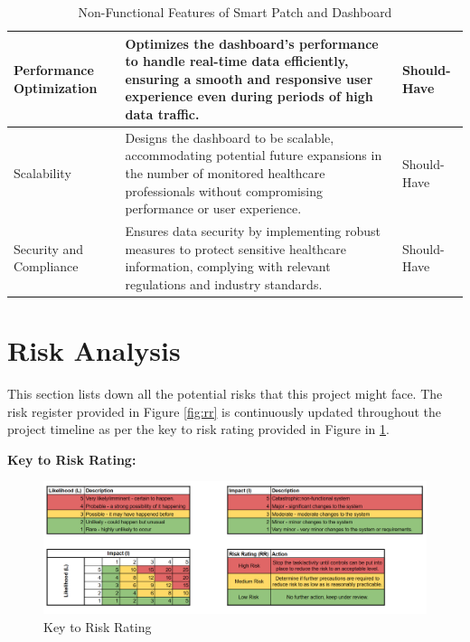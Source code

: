 \begin{table}[h!]
\begin{tabularx}{\textwidth}{|p{3cm}|X|p{2cm}|}
        Performance Optimization
        & Optimizes the dashboard's performance to handle real-time data efficiently, ensuring a smooth and responsive user experience even during periods of high data traffic.
        & Should-Have \\ \hline

        Scalability
        & Designs the dashboard to be scalable, accommodating potential future expansions in the number of monitored healthcare professionals without compromising performance or user experience.
        & Should-Have \\ \hline

        Security and Compliance
        & Ensures data security by implementing robust measures to protect sensitive healthcare information, complying with relevant regulations and industry standards.
        & Should-Have \\ \hline

    \end{tabularx}
    \caption{Non-Functional Features of Smart Patch and Dashboard}
    \label{table:non-functional-sp-db}
\end{table}

\newpage
\section{Risk Analysis}
 This section lists down all the potential risks that this project might face. The risk register provided in Figure \ref{fig:rr} is continuously updated throughout the project timeline as per the key to risk rating provided in Figure in \ref{fig:ktrr}.

\vspace{5.5cm}
\noindent\textbf{Key to Risk Rating:}
\begin{figure}[h!]
    \centering
    \includegraphics[width=1\linewidth]{images/ktrr.png}
    \caption{Key to Risk Rating}
    \label{fig:ktrr}
\end{figure}


